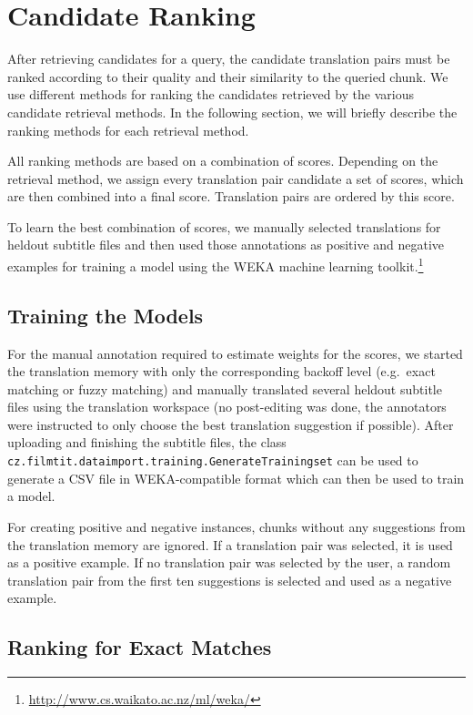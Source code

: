 \section{Candidate Ranking}
\label{sec:ranking}

After retrieving candidates for a query, the candidate translation pairs must be ranked according to their quality and their similarity to the queried chunk. We use different methods for ranking the candidates retrieved by the various candidate retrieval methods. In the following section, we will briefly describe the ranking methods for each retrieval method.

All ranking methods are based on a combination of scores. Depending on the retrieval method, we assign every translation pair candidate a set of scores, which are then combined into a final score. Translation pairs are ordered by this score.

To learn the best combination of scores, we manually selected translations for heldout subtitle files and then used those annotations as positive and negative examples for training a model using the WEKA machine learning toolkit.\footnote{\url{http://www.cs.waikato.ac.nz/ml/weka/}}

\subsection{Training the Models}

For the manual annotation required to estimate weights for the scores, we started the translation memory with only the corresponding backoff level (e.g.\ exact matching or fuzzy matching) and manually translated several heldout subtitle files using the translation workspace (no post-editing was done, the annotators were instructed to only choose the best translation suggestion if possible). After uploading and finishing the subtitle files, the class {\tt cz.filmtit.dataimport.training.GenerateTrainingset} can be used to generate a CSV file in WEKA-compatible format which can then be used to train a model.

For creating positive and negative instances, chunks without any suggestions from the translation memory are ignored. If a translation pair was selected, it is used as a positive example. If no translation pair was selected by the user, a random translation pair from the first ten suggestions is selected and used as a negative example.

\subsection{Ranking for Exact Matches}


